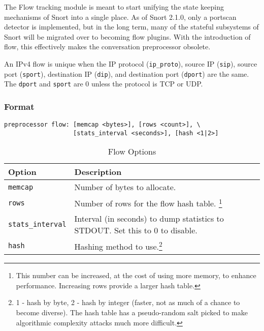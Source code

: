 \documentclass[english]{report}
\begin{document}
The Flow tracking module is meant to start unifying the state keeping
mechanisms of Snort into a single place. As of Snort 2.1.0, only a portscan
detector is implemented, but in the long term,  many of the stateful subsystems
of Snort will be migrated over to becoming flow plugins. With the introduction
of flow, this effectively makes the conversation preprocessor
obsolete.

An IPv4 flow is unique when the IP protocol (\texttt{ip\_proto}), source IP (\texttt{sip}),
source port (\texttt{sport}), destination IP (\texttt{dip}), and destination port (\texttt{dport}) are the
same.  The \texttt{dport} and \texttt{sport} are 0 unless the protocol is TCP or UDP.

\subsubsection{Format}
\begin{verbatim}
preprocessor flow: [memcap <bytes>], [rows <count>], \
                   [stats_interval <seconds>], [hash <1|2>]
\end{verbatim}

\begin{table}[hbpt]{}
\caption{Flow Options}
\begin{minipage}[hbpt]{6in}
\begin{center}\begin{tabular}{| l | l |}
\hline 
\textbf{Option} & \textbf{Description}\\
\hline
\hline
\texttt{memcap} &
Number of bytes to allocate.\\
\hline 
\texttt{rows} & Number of rows for the flow hash table. \footnote[1]{This number can be increased, at the cost of using more memory, to enhance performance. Increasing rows provide a larger hash table.}\\
\hline 
\texttt{stats\_interval} &
Interval (in seconds) to dump statistics to STDOUT. Set this to 0 to disable.\\
\hline 
\texttt{hash} & Hashing method to use.\footnote[2]{1 - hash by byte, 2 - hash by integer (faster, not as much of a chance to become diverse).  The hash table has a pseudo-random salt picked to make algorithmic complexity attacks much more difficult.}   \\
\hline
\end{tabular}
\end{center}
\end{minipage}
\end{table}
\end{document}
